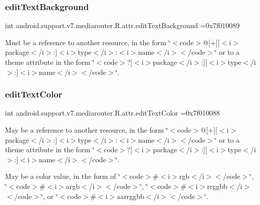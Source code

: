 \subsubsection{\texorpdfstring{edit\+Text\+Background}{editTextBackground}}
{\footnotesize\ttfamily int android.\+support.\+v7.\+mediarouter.\+R.\+attr.\+edit\+Text\+Background =0x7f010089\hspace{0.3cm}{\ttfamily [static]}}

Must be a reference to another resource, in the form \char`\"{}$<$code$>$@\mbox{[}+\mbox{]}\mbox{[}$<$i$>$package$<$/i$>$\+:\mbox{]}$<$i$>$type$<$/i$>$\+:$<$i$>$name$<$/i$>$$<$/code$>$\char`\"{} or to a theme attribute in the form \char`\"{}$<$code$>$?\mbox{[}$<$i$>$package$<$/i$>$\+:\mbox{]}\mbox{[}$<$i$>$type$<$/i$>$\+:\mbox{]}$<$i$>$name$<$/i$>$$<$/code$>$\char`\"{}. \mbox{\label{classandroid_1_1support_1_1v7_1_1mediarouter_1_1R_1_1attr_a543f76d56c48cfda37713fbce258c6f1}} 
\subsubsection{\texorpdfstring{edit\+Text\+Color}{editTextColor}}
{\footnotesize\ttfamily int android.\+support.\+v7.\+mediarouter.\+R.\+attr.\+edit\+Text\+Color =0x7f010088\hspace{0.3cm}{\ttfamily [static]}}

May be a reference to another resource, in the form \char`\"{}$<$code$>$@\mbox{[}+\mbox{]}\mbox{[}$<$i$>$package$<$/i$>$\+:\mbox{]}$<$i$>$type$<$/i$>$\+:$<$i$>$name$<$/i$>$$<$/code$>$\char`\"{} or to a theme attribute in the form \char`\"{}$<$code$>$?\mbox{[}$<$i$>$package$<$/i$>$\+:\mbox{]}\mbox{[}$<$i$>$type$<$/i$>$\+:\mbox{]}$<$i$>$name$<$/i$>$$<$/code$>$\char`\"{}. 

May be a color value, in the form of \char`\"{}$<$code$>$\#$<$i$>$rgb$<$/i$>$$<$/code$>$\char`\"{}, \char`\"{}$<$code$>$\#$<$i$>$argb$<$/i$>$$<$/code$>$\char`\"{}, \char`\"{}$<$code$>$\#$<$i$>$rrggbb$<$/i$>$$<$/code$>$\char`\"{}, or \char`\"{}$<$code$>$\#$<$i$>$aarrggbb$<$/i$>$$<$/code$>$\char`\"{}. \mbox{\label{classandroid_1_1support_1_1v7_1_1mediarouter_1_1R_1_1attr_a0c95d2cc5d88bdc8040dd1c8bf764a38}} 
